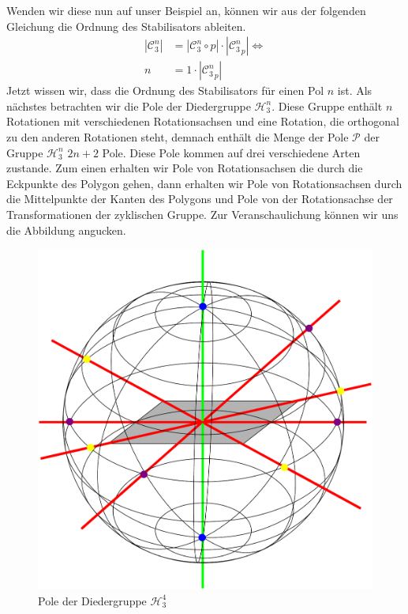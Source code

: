 Wenden wir diese nun auf unser Beispiel an, können wir aus der folgenden Gleichung die Ordnung des Stabilisators ableiten.
\begin{align*}
	 |\mathcal{C}_3^n| &= |\mathcal{C}_3^n \circ p| \cdot |{\mathcal{C}_3^n}_p| \Leftrightarrow\\
	 n &= 1 \cdot |{\mathcal{C}_3^n}_p|
\end{align*}
Jetzt wissen wir, dass die Ordnung des Stabilisators für einen Pol $n$ ist. Als nächstes betrachten wir die Pole der Diedergruppe $\mathcal{H}_3^n$. Diese Gruppe enthält $n$ Rotationen mit verschiedenen Rotationsachsen und eine Rotation, die orthogonal zu den anderen Rotationen steht, demnach enthält die Menge der Pole $\mathcal{P}$ der Gruppe $\mathcal{H}_3^n$ $2n+2$ Pole. Diese Pole kommen auf drei verschiedene Arten zustande. Zum einen erhalten wir Pole von Rotationsachsen die durch die Eckpunkte des Polygon gehen, dann erhalten wir Pole von Rotationsachsen durch die Mittelpunkte der Kanten des Polygons und Pole von der Rotationsachse der Transformationen der zyklischen Gruppe. Zur Veranschaulichung können wir uns die Abbildung angucken.
\begin{figure}[H]
\centering
\includegraphics[width=0.5\linewidth]{grafiken/pole_diedergruppe}
\caption{Pole der Diedergruppe $\mathcal{H}_3^4$}
\label{fig:pole_diedergruppe}
\end{figure}
